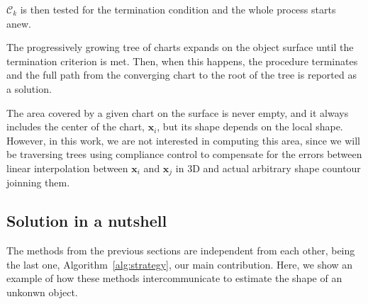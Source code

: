$\mathcal{C}_k$ is then tested for the termination condition and the whole process
starts anew.

The progressively growing tree of charts expands on the object surface until
the termination criterion is met. Then, when this happens, the procedure terminates and the full
path from the converging chart to the root of the tree is reported as a solution.

The area covered by a given chart on the surface is never empty, and
it always includes the center of the chart, $\mathbf{x}_{i}$, but its shape 
depends on the local shape. However, in this work, we are not interested in computing this area, 
since we will be traversing trees using compliance control to compensate for the errors between 
linear interpolation between $\mathbf{x}_i$ and $\mathbf{x}_j$ in 3D and actual arbitrary 
shape countour joinning them.

\subsection{Solution in a nutshell}
\label{sec:summary}

The methods from the previous sections are independent from each other, being the last one, Algorithm~\ref{alg:strategy}, our main contribution. Here, we show an example of how these methods intercommunicate to estimate the shape of an unkonwn object.

